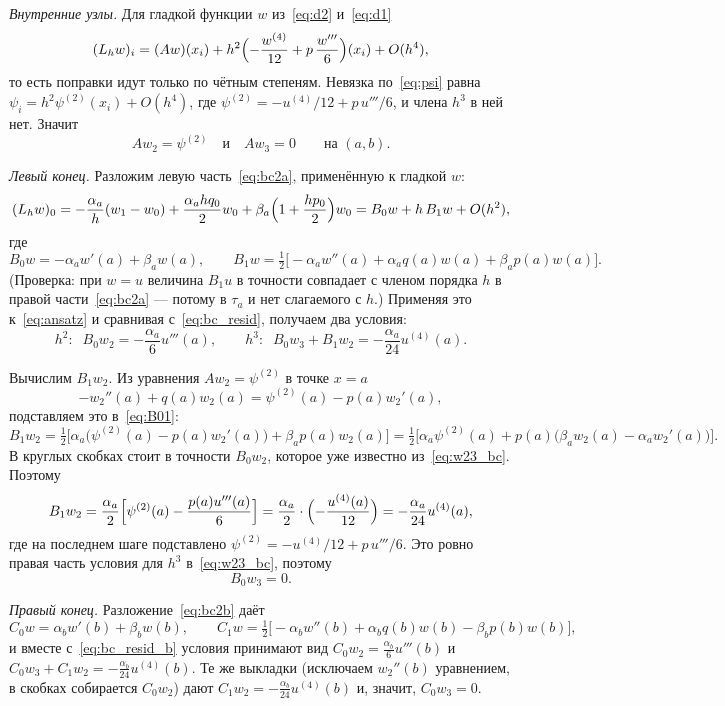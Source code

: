 \documentclass[12pt,a4paper]{article}
\begin{document}
\emph{Внутренние узлы.} Для гладкой функции $w$ из~\eqref{eq:d2}
и~\eqref{eq:d1}
\[
(L_hw)_i=(Aw)(x_i)+h^2\Bigl(-\frac{w^{(4)}}{12}+p\,\frac{w'''}{6}\Bigr)(x_i)
         +O(h^4),
\]
то есть поправки идут только по чётным степеням. Невязка
по~\eqref{eq:psi} равна $\psi_i=h^2\psi^{(2)}(x_i)+O(h^4)$, где
$\psi^{(2)}=-u^{(4)}/12+p\,u'''/6$, и члена $h^3$ в ней нет. Значит
\begin{equation}\label{eq:w23_inner}
A w_2=\psi^{(2)}\quad\text{и}\quad A w_3=0\qquad\text{на }(a,b).
\end{equation}

\emph{Левый конец.} Разложим левую часть~\eqref{eq:bc2a}, применённую к
гладкой $w$:
\[
(L_hw)_0=-\frac{\alpha_a}{h}(w_1-w_0)+\frac{\alpha_a h q_0}{2}w_0
         +\beta_a\Bigl(1+\frac{hp_0}{2}\Bigr)w_0
        =B_0w+h\,B_1w+O(h^2),
\]
где
\begin{equation}\label{eq:B01}
B_0w=-\alpha_aw'(a)+\beta_aw(a),\qquad
B_1w=\tfrac12\bigl[-\alpha_aw''(a)+\alpha_aq(a)w(a)+\beta_ap(a)w(a)\bigr].
\end{equation}
(Проверка: при $w=u$ величина $B_1u$ в точности совпадает с членом
порядка $h$ в правой части~\eqref{eq:bc2a} --- потому в $\tau_a$ и нет
слагаемого с $h$.) Применяя это к~\eqref{eq:ansatz} и сравнивая
с~\eqref{eq:bc_resid}, получаем два условия:
\begin{equation}\label{eq:w23_bc}
h^2:\;\; B_0w_2=-\frac{\alpha_a}{6}u'''(a),
\qquad
h^3:\;\; B_0w_3+B_1w_2=-\frac{\alpha_a}{24}u^{(4)}(a).
\end{equation}

Вычислим $B_1w_2$. Из уравнения $Aw_2=\psi^{(2)}$ в точке $x=a$
\[
-w_2''(a)+q(a)w_2(a)=\psi^{(2)}(a)-p(a)w_2'(a),
\]
подставляем это в~\eqref{eq:B01}:
\[
B_1w_2=\tfrac12\bigl[\alpha_a\bigl(\psi^{(2)}(a)-p(a)w_2'(a)\bigr)
                     +\beta_ap(a)w_2(a)\bigr]
      =\tfrac12\bigl[\alpha_a\psi^{(2)}(a)
                     +p(a)\bigl(\beta_aw_2(a)-\alpha_aw_2'(a)\bigr)\bigr].
\]
В круглых скобках стоит в точности $B_0w_2$, которое уже известно
из~\eqref{eq:w23_bc}. Поэтому
\[
B_1w_2=\frac{\alpha_a}{2}\Bigl[\psi^{(2)}(a)-\frac{p(a)u'''(a)}{6}\Bigr]
      =\frac{\alpha_a}{2}\cdot\Bigl(-\frac{u^{(4)}(a)}{12}\Bigr)
      =-\frac{\alpha_a}{24}u^{(4)}(a),
\]
где на последнем шаге подставлено $\psi^{(2)}=-u^{(4)}/12+p\,u'''/6$.
Это ровно правая часть условия для $h^3$ в~\eqref{eq:w23_bc}, поэтому
\[
B_0w_3=0 .
\]

\emph{Правый конец.} Разложение~\eqref{eq:bc2b} даёт
\[
C_0w=\alpha_bw'(b)+\beta_bw(b),\qquad
C_1w=\tfrac12\bigl[-\alpha_bw''(b)+\alpha_bq(b)w(b)-\beta_bp(b)w(b)\bigr],
\]
и вместе с~\eqref{eq:bc_resid_b} условия принимают вид
$C_0w_2=\tfrac{\alpha_b}{6}u'''(b)$ и
$C_0w_3+C_1w_2=-\tfrac{\alpha_b}{24}u^{(4)}(b)$. Те же выкладки
(исключаем $w_2''(b)$ уравнением, в скобках собирается $C_0w_2$) дают
$C_1w_2=-\tfrac{\alpha_b}{24}u^{(4)}(b)$ и, значит, $C_0w_3=0$.
\end{document}
